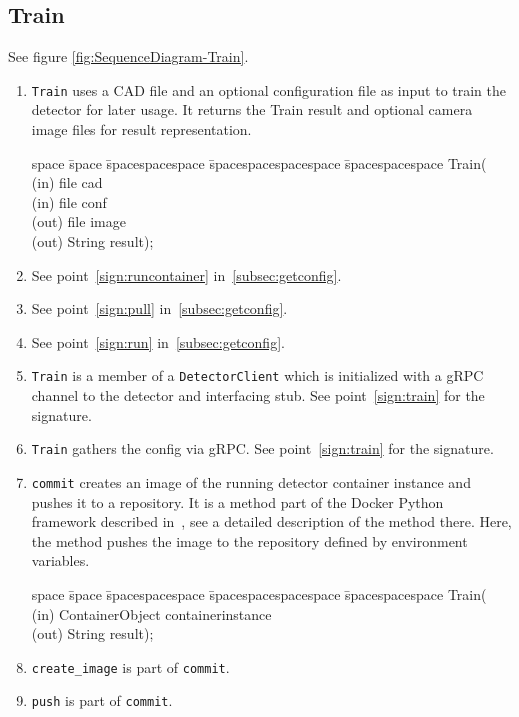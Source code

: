 \subsection{Train}
See figure \ref{fig:SequenceDiagram-Train}.
\begin{enumerate}
    \item \texttt{Train} uses a CAD file and an optional configuration file as input to train the detector for later usage. It returns the Train result and optional camera image files for result representation.
        \begin{tabbing}
        space \= space \= spacespacespace \= spacespacespacespace \= spacespacespace \kill
        \>  Train(\\
        \>  \>  (in)	 \> 	file          \> cad\\
        \>  \>  (in)	 \> 	file          \> conf\\
        \>  \>  (out)	 \> 	file          \> image\\
        \>  \>  (out)	 \> 	String           \> result); 
        \end{tabbing}\label{sign:train}
    \item See point~\ref{sign:runcontainer} in~\ref{subsec:getconfig}.
    \item See point~\ref{sign:pull} in~\ref{subsec:getconfig}.
    \item See point~\ref{sign:run} in~\ref{subsec:getconfig}.
    \item \texttt{Train} is a member of a \texttt{DetectorClient} which is initialized with a gRPC channel to the detector and interfacing stub. See point~\ref{sign:train} for the signature.
    \item \texttt{Train} gathers the config via gRPC. See point~\ref{sign:train} for the signature.
    \item \texttt{commit} creates an image of the running detector container instance and pushes it to a repository. It is a method part of the Docker Python framework described in~\cite{Docker-Py-Documentation2019Docker2019}, see a detailed description of the method there. Here, the method pushes the image to the repository defined by environment variables.
    \begin{tabbing}
    space \= space \= spacespacespace \= spacespacespacespace \= spacespacespace \kill
    \>  Train(\\
    \>  \>  (in)	 \> 	ContainerObject          \> containerinstance\\
    \>  \>  (out)	 \> 	String           \> result); 
    \end{tabbing}\label{sign:commit}
    \item \texttt{create_image} is part of \texttt{commit}.
    \item \texttt{push} is part of \texttt{commit}.
\end{enumerate}

